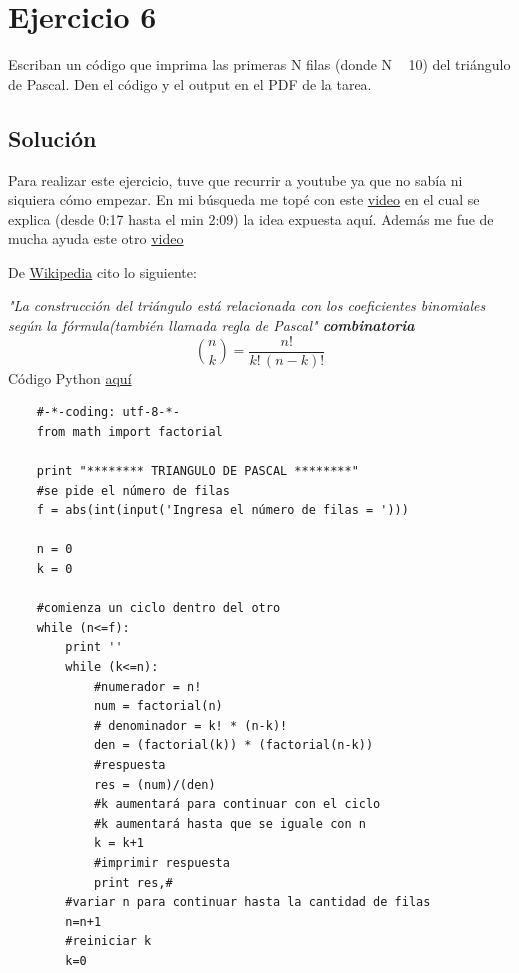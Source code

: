 \documentclass{article}
\begin{document}


\newpage
\section{Ejercicio 6}
Escriban un código que imprima las primeras N filas (donde N ~ 10) del triángulo
de Pascal. Den el código y el output en el PDF de la tarea.

\subsection{Solución}

Para realizar este ejercicio, tuve que recurrir a youtube ya que no sabía ni siquiera cómo empezar. En mi búsqueda me topé con este \href{https://www.youtube.com/watch?v=qRnmis3nYLI&t=106s}{video} en el cual se explica (desde 0:17 hasta el min 2:09) la idea expuesta aquí. Además me fue de mucha ayuda este otro \href {https://www.youtube.com/watch?v=Ut5AGIMkPoQ}{video}

De \href{https://es.wikipedia.org/wiki/Tri\%C3\%A1ngulo_de_Pascal}{Wikipedia} cito lo siguiente: 

\textit{"La construcción del triángulo está relacionada con los coeficientes binomiales según la fórmula(también llamada regla de Pascal" \textbf{combinatoria}}
\begin{equation*}
    {n \choose k } = \frac{n!}{k!\, (n-k)!}
\end{equation*}
Código Python \href{https://github.com/joescalona/Programacion-Astronomica/blob/master/Tarea\%205/problema6.py}{aquí}
    \begin{verbatim}
    #-*-coding: utf-8-*-
    from math import factorial
    
    print "******** TRIANGULO DE PASCAL ********"
    #se pide el número de filas
    f = abs(int(input('Ingresa el número de filas = ')))
    
    n = 0
    k = 0
    
    #comienza un ciclo dentro del otro
    while (n<=f):
        print ''
        while (k<=n):
            #numerador = n!
            num = factorial(n)
            # denominador = k! * (n-k)!
            den = (factorial(k)) * (factorial(n-k))
            #respuesta
            res = (num)/(den)
            #k aumentará para continuar con el ciclo
            #k aumentará hasta que se iguale con n 
            k = k+1
            #imprimir respuesta
            print res,#
        #variar n para continuar hasta la cantidad de filas  
        n=n+1
        #reiniciar k 
        k=0
    \end{verbatim}
    
\end{document}
